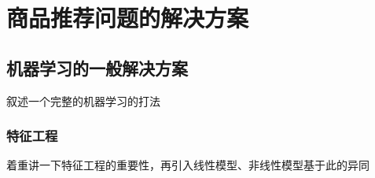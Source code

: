 \chapter{商品推荐问题的解决方案}

\section{机器学习的一般解决方案}
  叙述一个完整的机器学习的打法

  \subsection{特征工程}
  着重讲一下特征工程的重要性，再引入线性模型、非线性模型基于此的异同
